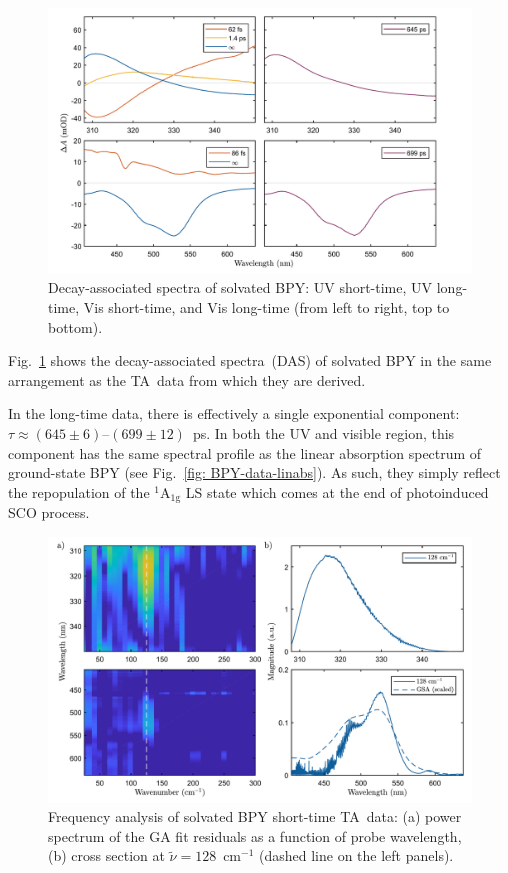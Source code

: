 \begin{figure}[t!]
  \centering
  \includegraphics[width = \textwidth]{Figures/fig_BPY_data_aqueous_DAS.pdf}
  \caption[Decay-associated spectra of solvated BPY.]{
    Decay-associated spectra of solvated BPY:
    UV short-time, UV long-time, Vis short-time, and Vis long-time
    (from left to right, top to bottom).
  }
  \label{fig: BPY-data-aqueous-DAS}
\end{figure}
%
Fig.~\ref{fig: BPY-data-aqueous-DAS} shows
the decay-associated spectra~(DAS) of solvated BPY
in the same arrangement as the TA~data from which they are derived.

In the long-time data, there is effectively a single exponential component:
$\tau \approx (645 \pm 6)$--$(699 \pm 12)$~ps.
In both the UV and visible region, this component has the same spectral profile as
the linear absorption spectrum of ground-state BPY (see Fig.~\ref{fig: BPY-data-linabs}).
As such, they simply reflect the repopulation of the $\mathrm{^1 A_{1g}}$ LS state
which comes at the end of photoinduced SCO process.

\begin{figure}[t!]
  \centering
  \includegraphics[width = \textwidth]{Figures/fig_BPY_data_aqueous_Welch.pdf}
  \caption[Frequency analysis of solvated BPY short-time TA~data.]{
    Frequency analysis of solvated BPY short-time TA~data:
    (a) power spectrum of the GA fit residuals as a function of probe wavelength,
    (b) cross section at $\tilde{\nu} = 128$~cm$^{-1}$ (dashed line on the left panels).
  }
  \label{fig: BPY-data-aqueous-Welch}
\end{figure}

